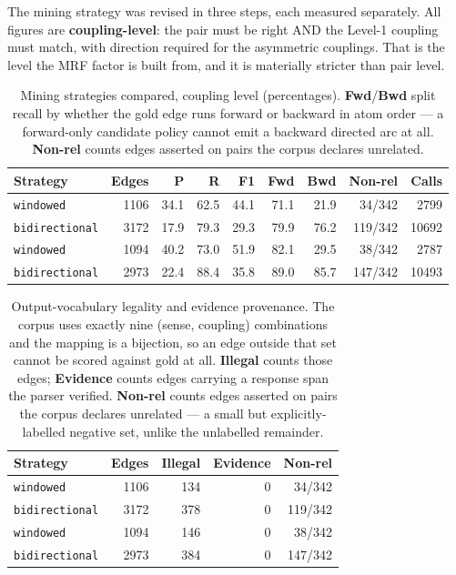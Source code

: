 \documentclass[11pt]{article}
\begin{document}
The mining strategy was revised in three steps, each measured separately. All figures are \textbf{coupling-level}: the pair must be right AND the Level-1 coupling must match, with direction required for the asymmetric couplings. That is the level the MRF factor is built from, and it is materially stricter than pair level.

\begin{table}[htbp]
\centering
\small
\caption{Mining strategies compared, coupling level (percentages). \textbf{Fwd}/\textbf{Bwd} split recall by whether the gold edge runs forward or backward in atom order --- a forward-only candidate policy cannot emit a backward directed arc at all. \textbf{Non-rel} counts edges asserted on pairs the corpus declares unrelated.}
\label{tab:strategy-comparison}
\begin{tabular}{lrrrrrrrr}
\toprule
Strategy & Edges & P & R & F1 & Fwd & Bwd & Non-rel & Calls \\
\midrule
\texttt{windowed} & 1106 & 34.1 & 62.5 & 44.1 & 71.1 & 21.9 & 34/342 & 2799 \\
\texttt{bidirectional} & 3172 & 17.9 & 79.3 & 29.3 & 79.9 & 76.2 & 119/342 & 10692 \\
\texttt{windowed} & 1094 & 40.2 & 73.0 & 51.9 & 82.1 & 29.5 & 38/342 & 2787 \\
\texttt{bidirectional} & 2973 & 22.4 & 88.4 & 35.8 & 89.0 & 85.7 & 147/342 & 10493 \\
\bottomrule
\end{tabular}
\end{table}

\begin{table}[htbp]
\centering
\small
\caption{Output-vocabulary legality and evidence provenance. The corpus uses exactly nine (sense, coupling) combinations and the mapping is a bijection, so an edge outside that set cannot be scored against gold at all. \textbf{Illegal} counts those edges; \textbf{Evidence} counts edges carrying a response span the parser verified. \textbf{Non-rel} counts edges asserted on pairs the corpus declares unrelated --- a small but explicitly-labelled negative set, unlike the unlabelled remainder.}
\label{tab:vocabulary-legality}
\begin{tabular}{lrrrr}
\toprule
Strategy & Edges & Illegal & Evidence & Non-rel \\
\midrule
\texttt{windowed} & 1106 & 134 & 0 & 34/342 \\
\texttt{bidirectional} & 3172 & 378 & 0 & 119/342 \\
\texttt{windowed} & 1094 & 146 & 0 & 38/342 \\
\texttt{bidirectional} & 2973 & 384 & 0 & 147/342 \\
\bottomrule
\end{tabular}
\end{table}
\end{document}
